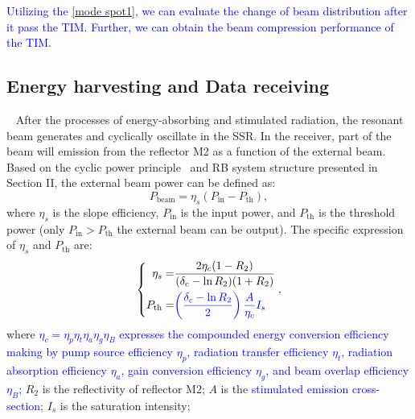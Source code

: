 \documentclass{IEEEtran}
\begin{document}
\textcolor{blue}{Utilizing the \eqref{mode spot1}, we can evaluate the change of beam distribution after it pass the TIM. Further, we can obtain the beam compression performance of the TIM.}
\subsection{Energy harvesting and Data receiving}\
After the processes of energy-absorbing and stimulated radiation, the resonant beam generates and cyclically oscillate in the SSR. In the receiver, part of the beam will emission from the reflector M2 as a function of the external beam. 
Based on the cyclic power principle~\cite{koechner2013solid} and RB system structure presented in Section II, the external beam power can be defined as:
\begin{equation}\label{Plaser2}
    P_\mathrm{beam}=\eta_s(P_\mathrm{in}-P_\mathrm{th}),
\end{equation}
where $\eta_s$ is the slope efficiency, $P_\mathrm{in}$ is the input power, and $P_\mathrm{th}$ is the threshold power (only $P_\mathrm{in}>P_\mathrm{th}$ the external beam can be output). The specific expression of $\eta_s$ and $P_\mathrm{th}$ are:
\begin{equation}\label{etas}
\left\{
\begin{aligned}
\eta_s=& \frac{2 \eta_c(1-R_2)}{(\delta_c-\ln R_2)(1+R_2)}\\
P_{\mathrm{th}}=&\textcolor{blue}{\left(\frac{\delta_c-\ln R_2}{2}\right) \frac{A }{\eta_c}I_s}
\end{aligned} 
\right.,
\end{equation}
where \textcolor{blue}{$\eta_c=\eta_p \eta_t \eta_a \eta_g \eta_B$ expresses the compounded energy conversion efficiency making by pump source efficiency $\eta_p$, radiation transfer efficiency $\eta_t$, radiation absorption efficiency $\eta_a$, gain conversion efficiency $\eta_g$, and beam overlap  efficiency $\eta_B$;} $R_2$ is the reflectivity of reflector M2; $A$ is the \textcolor{blue}{stimulated emission cross-section}; $I_s$ is the saturation intensity; 
\end{document}
